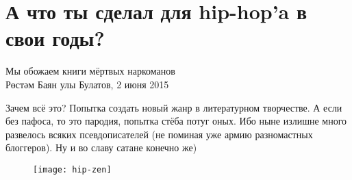 \section*{А что ты сделал для hip-hop'a в свои годы?}\label{section:one}
\begin{epigraph}
        Мы обожаем книги мёртвых наркоманов\\
        {\normalfont Рөстәм Баян улы Булатов, 2 июня 2015}
\end{epigraph}
Зачем всё это? Попытка создать новый жанр в литературном творчестве.
А если без пафоса, то это пародия, попытка стёба потуг оных. Ибо ныне излишне много развелось всяких псевдописателей (не поминая уже армию разномастных блоггеров).
Ну и во славу сатане конечно же)
\begin{figure}[ht!]
    \centering
    \texttt{[image: hip-zen]}
\end{figure}
